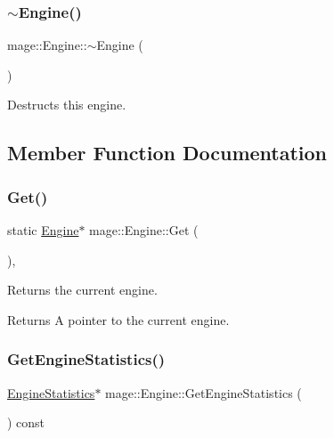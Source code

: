 \subsubsection{\texorpdfstring{$\sim$\+Engine()}{~Engine()}}
{\footnotesize\ttfamily mage\+::\+Engine\+::$\sim$\+Engine (\begin{DoxyParamCaption}{ }\end{DoxyParamCaption})\hspace{0.3cm}{\ttfamily [virtual]}}

Destructs this engine. 

\subsection{Member Function Documentation}
\hypertarget{classmage_1_1_engine_a146c8898afd978b4d1f0528128a43bbf}{}\label{classmage_1_1_engine_a146c8898afd978b4d1f0528128a43bbf} 
\subsubsection{\texorpdfstring{Get()}{Get()}}
{\footnotesize\ttfamily static \hyperlink{classmage_1_1_engine}{Engine}$\ast$ mage\+::\+Engine\+::\+Get (\begin{DoxyParamCaption}{ }\end{DoxyParamCaption})\hspace{0.3cm}{\ttfamily [static]}, {\ttfamily [noexcept]}}

Returns the current engine.

\begin{DoxyReturn}{Returns}
A pointer to the current engine. 
\end{DoxyReturn}
\hypertarget{classmage_1_1_engine_aacbd029d5e8f00e0acdb0f4d7cc04236}{}\label{classmage_1_1_engine_aacbd029d5e8f00e0acdb0f4d7cc04236} 
\subsubsection{\texorpdfstring{Get\+Engine\+Statistics()}{GetEngineStatistics()}}
{\footnotesize\ttfamily \hyperlink{classmage_1_1_engine_statistics}{Engine\+Statistics}$\ast$ mage\+::\+Engine\+::\+Get\+Engine\+Statistics (\begin{DoxyParamCaption}{ }\end{DoxyParamCaption}) const\hspace{0.3cm}{\ttfamily [noexcept]}}

